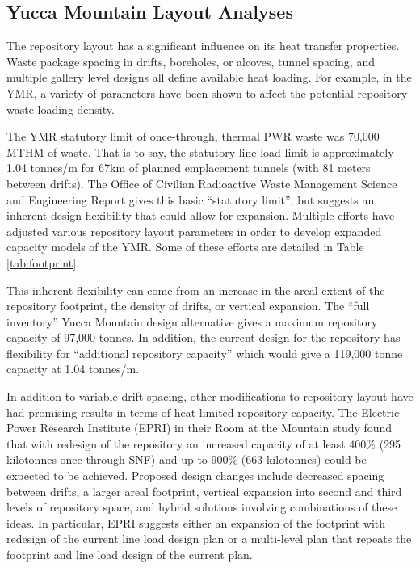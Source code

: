 

\subsection{Yucca Mountain Layout Analyses}

The repository layout has a significant influence on its heat transfer 
properties.  Waste package spacing in drifts, boreholes, or alcoves, tunnel
spacing, and multiple gallery level designs all define available 
heat loading.  For example, in the \gls{YMR}, a variety of parameters have been 
shown to affect the potential repository waste loading density. 

The \gls{YMR} statutory limit of once-through, thermal PWR waste was 70,000 
\gls{MTHM} of waste.  That is to say, the statutory line load limit is approximately 1.04 tonnes/m
for 67km of planned emplacement tunnels (with 81 meters between drifts). The
Office of Civilian Radioactive Waste Management Science and Engineering Report
gives this basic ``statutory limit'', but suggests an inherent design
flexibility that could allow for expansion. Multiple efforts have adjusted 
various repository layout parameters in order to develop expanded capacity 
models of the \gls{YMR}. Some of these efforts are detailed in Table 
\ref{tab:footprint}.

 

This inherent flexibility can come from an increase in the areal extent of the 
repository footprint, the density of drifts, or vertical expansion. The  ``full inventory'' Yucca
Mountain design alternative gives a maximum repository capacity of 97,000
tonnes. In addition, the current design for the repository has flexibility for
``additional repository capacity'' which would give a 119,000 tonne capacity at
1.04 tonnes/m.\cite{doe_yucca_2002} 

In addition to variable drift spacing, other modifications to repository layout
have had promising results in terms of heat-limited repository capacity. The
Electric Power Research Institute (EPRI) in their Room at the Mountain study
found that with redesign of the repository an increased capacity of at least
$400\%$ (295 kilotonnes once-through SNF) and up to $900\%$ (663 kilotonnes) could be
expected to be achieved. Proposed design changes include decreased spacing
between drifts, a larger areal footprint, vertical expansion into second and
third levels of repository space, and hybrid solutions involving combinations
of these ideas. In particular, EPRI suggests either an expansion of the
footprint with redesign of the current line load design plan or a
multi-level plan that repeats the footprint and line load design of the current
plan\cite{kessler_room_2006}.

